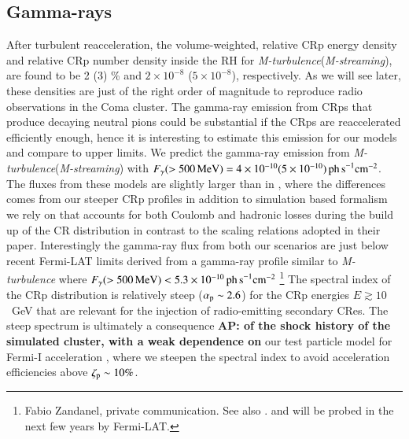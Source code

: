 \documentclass[a4paper,fleqn,usenatbib]{mnras}
\newcommand{\Mstream}{{\it M-streaming}\xspace}
\newcommand{\Mflatturb}{{\it M-turbulence}\xspace}
\def\AP#1{{\bf  AP: #1}}
\begin{document}
\subsection{Gamma-rays}
After turbulent reacceleration, the volume-weighted, relative CRp
energy density and relative CRp number density inside the RH for
\Mflatturb (\Mstream), are found to be 2 (3) \% and $2\times10^{-8}$
($5\times10^{-8}$), respectively. As we will see later, these
densities are just of the right order of magnitude to reproduce radio
observations in the Coma cluster. The gamma-ray emission from CRps
that produce decaying neutral pions could be substantial if the CRps
are reaccelerated efficiently enough, hence it is interesting to
estimate this emission for our models and compare to upper limits. We
predict the gamma-ray emission from \Mflatturb (\Mstream) with
$F_\gamma(>500\,{\mathrm{MeV}})=4\times10^{-10} (5\times10^{-10}) \mathrm{
  \,ph\, s}^{-1}\mathrm{cm}^{-2}$. The fluxes from these models are
slightly larger than in \cite{brunetti12}, where the differences comes
from our steeper CRp profiles in addition to simulation based
formalism we rely on that accounts for both Coulomb and hadronic
losses during the build up of the CR distribution in contrast to the
scaling relations adopted in their paper. Interestingly the gamma-ray
flux from both our scenarios are just below recent Fermi-LAT limits
derived from a gamma-ray profile similar to \Mflatturb where
$F_\gamma(>500\,{\mathrm{MeV}})<5.3\times10^{-10} \mathrm{ \,ph\,
  s}^{-1}\mathrm{cm}^{-2}$ \footnote{Fabio Zandanel, private
  communication. See also
  \citet{2014MNRAS.440..663Z,2014ApJ...787...18A}. and will be probed
  in the next few years by Fermi-LAT. } The spectral index of the CRp
distribution is relatively steep ($\alpha_{{\mathrm{p}}}\sim2.6$) for the
CRp energies $E \gtrsim 10$~GeV that are relevant for the injection of
radio-emitting secondary CRes. The steep spectrum is ultimately a
consequence \AP{of the shock history of the simulated cluster, with a
  weak dependence on} our test particle model for Fermi-I acceleration
\citep{pinzke13}, where we steepen the spectral index to avoid
acceleration efficiencies above $\zeta_{{\mathrm{p}}} \sim 10\%$.
\end{document}
